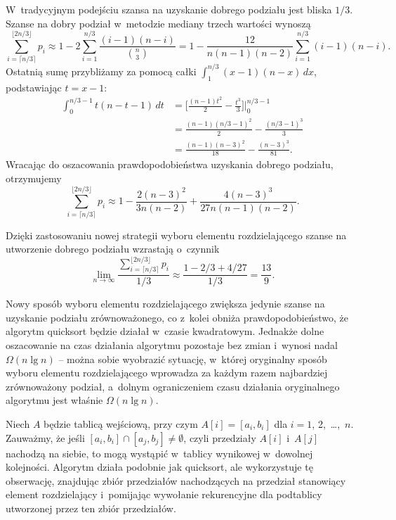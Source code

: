 \subproblem %
W~tradycyjnym podejściu szansa na uzyskanie dobrego podziału jest bliska $1/3$. Szanse na dobry podział w~metodzie mediany trzech wartości wynoszą
\[
	\sum_{i=\lceil n/3\rceil}^{\lfloor 2n/3\rfloor}p_i \approx 1-2\sum_{i=1}^{n/3}\frac{(i-1)(n-i)}{\binom{n}{3}} = 1-\frac{12}{n(n-1)(n-2)}\sum_{i=1}^{n/3}(i-1)(n-i).
\]
Ostatnią sumę przybliżamy za pomocą całki $\int_1^{n/3}(x-1)(n-x)\,dx$, podstawiając $t=x-1$:
\begin{align*}
    \int_0^{n/3-1}t(n-t-1)\,dt &= \biggl[\frac{(n-1)t^2}{2}-\frac{t^3}{3}\biggr]\bigg|_0^{n/3-1} \\[1mm]
	&= \frac{(n-1)(n/3-1)^2}{2}-\frac{(n/3-1)^3}{3} \\[1mm]
	&= \frac{(n-1)(n-3)^2}{18}-\frac{(n-3)^3}{81}.
\end{align*}
Wracając do oszacowania prawdopodobieństwa uzyskania dobrego podziału, otrzymujemy
\[
    \sum_{i=\lceil n/3\rceil}^{\lfloor 2n/3\rfloor}p_i \approx 1-\frac{2(n-3)^2}{3n(n-2)}+\frac{4(n-3)^3}{27n(n-1)(n-2)}.
\]

Dzięki zastosowaniu nowej strategii wyboru elementu rozdzielającego szanse na utworzenie dobrego podziału wzrastają o~czynnik
\[
	\lim_{n\to\infty}\frac{\sum_{i=\lceil n/3\rceil}^{\lfloor 2n/3\rfloor}p_i}{1/3} \approx \frac{1-2/3+4/27}{1/3} = \frac{13}{9}.
\]

\subproblem %
Nowy sposób wyboru elementu rozdzielającego zwiększa jedynie szanse na uzyskanie podziału zrównoważonego, co z~kolei obniża prawdopodobieństwo, że algorytm quicksort będzie działał w~czasie kwadratowym. Jednakże dolne oszacowanie na czas działania algorytmu pozostaje bez zmian i~wynosi nadal $\Omega(n\lg n)$ -- można sobie wyobrazić sytuację, w~której oryginalny sposób wyboru elementu rozdzielającego wprowadza za każdym razem najbardziej zrównoważony podział, a~dolnym ograniczeniem czasu działania oryginalnego algorytmu jest właśnie $\Omega(n\lg n)$.


\subproblem %
Niech $A$ będzie tablicą wejściową, przy czym $A[i]=[a_i,b_i]$ dla $i=1$, 2,~\dots,~$n$. Zauważmy, że jeśli $[a_i,b_i]\cap[a_j,b_j]\ne\emptyset$, czyli przedziały $A[i]$ i~$A[j]$ nachodzą na siebie, to mogą wystąpić w~tablicy wynikowej w~dowolnej kolejności. Algorytm działa podobnie jak quicksort, ale wykorzystuje tę obserwację, znajdując zbiór przedziałów nachodzących na przedział stanowiący element rozdzielający i~pomijając wywołanie rekurencyjne dla podtablicy utworzonej przez ten zbiór przedziałów.

